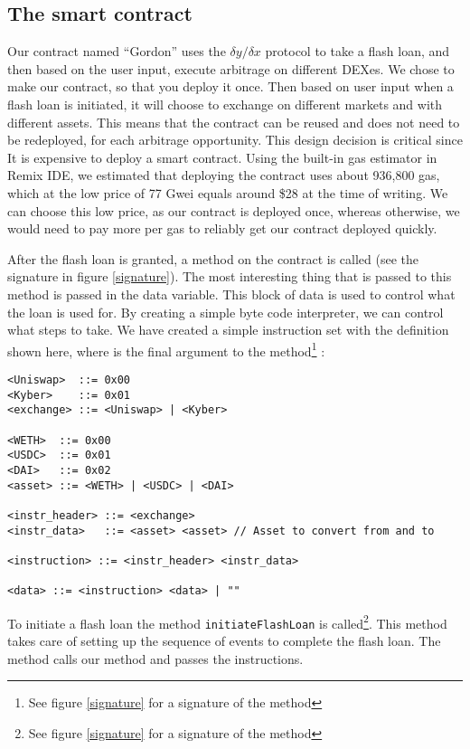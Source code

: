 \subsection{The smart contract}
Our contract named ``Gordon'' uses the $\delta y/\delta x$ protocol to take a
flash loan, and then based on the user input, execute arbitrage on different
DEXes. We chose to make our contract, so that you deploy it once. Then based on
user input when a flash loan is initiated, it will choose to exchange on
different markets and with different assets. This means that the contract can be
reused and does not need to be redeployed, for each arbitrage opportunity. This
design decision is critical since It is expensive to deploy a smart contract.
Using the built-in gas estimator in Remix IDE, we estimated that deploying the
contract uses about 936,800 gas, which at the low price of 77 Gwei equals around
\$28 at the time of writing. We can choose this low price, as our contract is
deployed once, whereas otherwise, we would need to pay more per gas to reliably
get our contract deployed quickly.

\noindent After the flash loan is granted, a method on the contract is called
(see the signature in figure \ref{signature}). The most interesting thing that
is passed to this method is passed in the data variable. This block of data is
used to control what the loan is used for. By creating a simple byte code
interpreter, we can control what steps to take. We have created a simple
instruction set with the definition shown here, where  is the final
argument to the method\footnote{See figure \ref{signature} for a signature of
the method} :

\begin{samepage}
\begin{verbatim}
<Uniswap>  ::= 0x00
<Kyber>    ::= 0x01
<exchange> ::= <Uniswap> | <Kyber>

<WETH>  ::= 0x00
<USDC>  ::= 0x01
<DAI>   ::= 0x02
<asset> ::= <WETH> | <USDC> | <DAI>

<instr_header> ::= <exchange>
<instr_data>   ::= <asset> <asset> // Asset to convert from and to

<instruction> ::= <instr_header> <instr_data>

<data> ::= <instruction> <data> | ""
\end{verbatim}
\end{samepage}

\noindent To initiate a flash loan the method \verb|initiateFlashLoan| is
called\footnote{See figure \ref{signature} for a signature of the method}. This
method takes care of setting up the sequence of events to complete the flash
loan. The method calls our  method and passes the
instructions.


